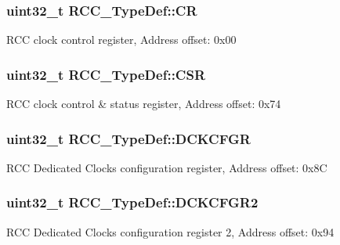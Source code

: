 \subsubsection[{\texorpdfstring{CR}{CR}}]{ uint32\+\_\+t R\+C\+C\+\_\+\+Type\+Def\+::\+CR}\hypertarget{struct_r_c_c___type_def_abcb9ff48b9afb990283fefad0554b5b3}{}\label{struct_r_c_c___type_def_abcb9ff48b9afb990283fefad0554b5b3}
R\+CC clock control register, Address offset\+: 0x00 
\subsubsection[{\texorpdfstring{C\+SR}{CSR}}]{ uint32\+\_\+t R\+C\+C\+\_\+\+Type\+Def\+::\+C\+SR}\hypertarget{struct_r_c_c___type_def_a7e913b8bf59d4351e1f3d19387bd05b9}{}\label{struct_r_c_c___type_def_a7e913b8bf59d4351e1f3d19387bd05b9}
R\+CC clock control \& status register, Address offset\+: 0x74 
\subsubsection[{\texorpdfstring{D\+C\+K\+C\+F\+GR}{DCKCFGR}}]{ uint32\+\_\+t R\+C\+C\+\_\+\+Type\+Def\+::\+D\+C\+K\+C\+F\+GR}\hypertarget{struct_r_c_c___type_def_a877ad70fcd4a215bc8f9bb31fdc8d3d1}{}\label{struct_r_c_c___type_def_a877ad70fcd4a215bc8f9bb31fdc8d3d1}
R\+CC Dedicated Clocks configuration register, Address offset\+: 0x8C 
\subsubsection[{\texorpdfstring{D\+C\+K\+C\+F\+G\+R2}{DCKCFGR2}}]{ uint32\+\_\+t R\+C\+C\+\_\+\+Type\+Def\+::\+D\+C\+K\+C\+F\+G\+R2}\hypertarget{struct_r_c_c___type_def_ab93289a279c9809be3f93217722e4973}{}\label{struct_r_c_c___type_def_ab93289a279c9809be3f93217722e4973}
R\+CC Dedicated Clocks configuration register 2, Address offset\+: 0x94 
